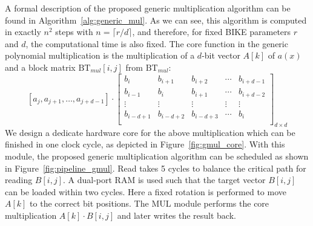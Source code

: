 \documentclass[runningheads]{llncs}
\begin{document}
A formal description of the proposed generic multiplication algorithm
can be found in Algorithm~\ref{alg:generic_mul}.
As we can see, this algorithm is computed in exactly $n^2$ steps with $n=\lceil r/d\rceil$, and therefore, for fixed BIKE parameters $r$ and $d$, the computational time is also fixed.
The core function in the generic polynomial multiplication
is the multiplication of a $d$-bit vector $A[k]$ of $a(x)$ and a block matrix $\text{BT}_{mul}$$[i,j]$ from $\text{BT}_{mul}$:
\[
    [a_j,a_{j+1},\ldots,a_{j+d-1}]\cdot
\left[ \begin{array}{ccccc}
b_{i}&b_{i+1}&b_{i+2}&\cdots &b_{i+d-1} \\
b_{i-1}&b_{i}&b_{i+1}&\cdots &b_{i+d-2} \\
\vdots&\vdots&\vdots&\vdots&\vdots\\
b_{i-d+1}&b_{i-d+2}&b_{i-d+3}&\cdots &b_{i} \\
\end{array}
\right ]_{d\times d}
\]
We design a dedicate hardware core for the above multiplication which can be
finished in one clock cycle, as depicted in Figure~\ref{fig:gmul_core}.
With this module, the proposed generic multiplication algorithm
can be scheduled as shown in Figure~\ref{fig:pipeline_gmul}.
Read takes 5 cycles to balance the critical path for reading $B[i,j]$.
A dual-port RAM is used such that the target vector $B[i,j]$ can be loaded within two cycles. Here a fixed rotation is performed to move $A[k]$ to the correct bit positions.
The MUL module performs the core multiplication $A[k]\cdot B[i,j]$ and later writes
the result back.




\end{document}
